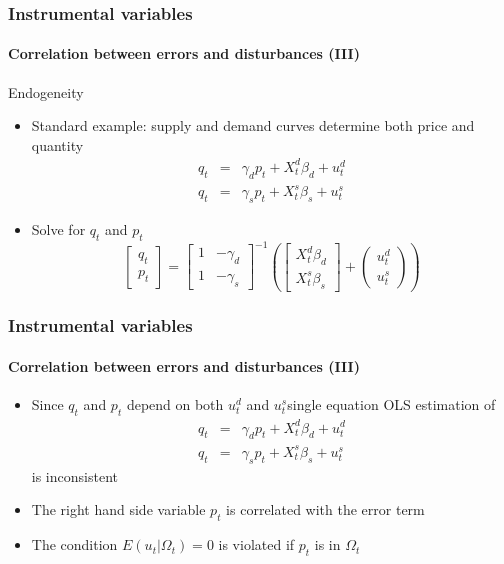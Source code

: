 \documentclass[notes=show]{beamer}
\begin{document}
\begin{frame}\frametitle{Instrumental variables}\framesubtitle{Correlation between errors and disturbances (III)}
Endogeneity
\begin{itemize}
    \item Standard example: supply and demand curves determine both price and quantity
    \begin{eqnarray*}
        q_{t} &=&\gamma _{d}p_{t}+X_{t}^{d}\beta _{d}+u_{t}^{d} \\
        q_{t} &=&\gamma _{s}p_{t}+X_{t}^{s}\beta _{s}+u_{t}^{s}
    \end{eqnarray*}
    \item Solve for $q_{t}$ and $p_{t}$
    \begin{equation*}
        \left[
        \begin{array}{c}
        q_{t} \\
        p_{t}
        \end{array}
        \right] =\left[
        \begin{array}{ll}
        1 & -\gamma _{d} \\
        1 & -\gamma _{s}
        \end{array}
        \right] ^{-1}\left( \left[
        \begin{array}{c}
        X_{t}^{d}\beta _{d} \\
        X_{t}^{s}\beta _{s}
        \end{array}
        \right] +\left(
        \begin{array}{c}
        u_{t}^{d} \\
        u_{t}^{s}
        \end{array}
        \right) \right)
    \end{equation*}
\end{itemize}
\end{frame}


\begin{frame}\frametitle{Instrumental variables}\framesubtitle{Correlation between errors and disturbances (III)}
\begin{itemize}
    \item Since $q_{t}$ and $p_{t}$ depend on both $u_{t}^{d}$ and $u_{t}^{s}$single equation OLS estimation of
    \begin{eqnarray*}
        q_{t} &=&\gamma _{d}p_{t}+X_{t}^{d}\beta _{d}+u_{t}^{d} \\
        q_{t} &=&\gamma _{s}p_{t}+X_{t}^{s}\beta _{s}+u_{t}^{s}
    \end{eqnarray*}
    is inconsistent
    \item The right hand side variable $p_{t}$ is correlated with the error term
    \item The condition $E\left( u_{t}|\Omega _{t}\right) =0$ is violated if $p_{t}$ is in $\Omega _{t}$
\end{itemize}
\end{frame}
\end{document}
